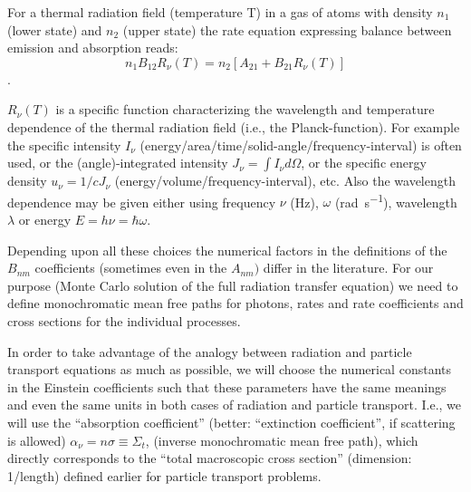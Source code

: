 For a thermal radiation field (temperature T) in a gas of atoms with density
$n_1$ (lower state) and $n_2$ (upper state) the rate equation expressing
balance between emission and absorption reads:
\begin{displaymath}
  n_1 B_{12}
  R_\nu(T)= n_2[A_{21}+B_{21} R_\nu(T)]
\end{displaymath}
.

$R_\nu(T)$ is a specific function characterizing the wavelength and temperature
dependence of the thermal radiation field (i.e., the Planck-function).
For example the specific intensity $I_\nu$
(energy\-/area\-/time\-/solid-angle\-/frequency-interval) is often used, or the
(angle)-integrated intensity $J_\nu = \int I_\nu d\Omega$, or the specific
energy density $u_\nu = 1/c J_\nu$ (energy\-/volume\-/frequency-interval), etc.
Also the wavelength dependence may be given either using frequency $\nu$ (Hz),
$\omega$ (\si{\radian\per\second}), wavelength $\lambda$ or energy $E = h
  \nu=\hbar \omega$.

Depending upon all these choices the numerical factors in the definitions of
the $B_{nm}$ coefficients (sometimes even in the $A_{nm})$ differ in the
literature.
For our purpose (Monte Carlo solution of the full radiation transfer equation)
we need to define monochromatic mean free paths for photons, rates and rate
coefficients and cross sections for the individual processes.

In order to take advantage of the analogy between radiation and particle
transport equations as much as possible, we will choose the numerical constants
in the Einstein coefficients such that these parameters have the same meanings
and even the same units in both cases of radiation and particle transport.
I.e., we will use the ``absorption coefficient'' (better: ``extinction
coefficient'', if scattering is allowed) $\alpha_{\nu} = n \sigma \equiv
  \Sigma_t$, (inverse monochromatic mean free path), which directly corresponds
to the ``total macroscopic cross section'' (dimension: 1/length) defined
earlier for particle transport problems.



